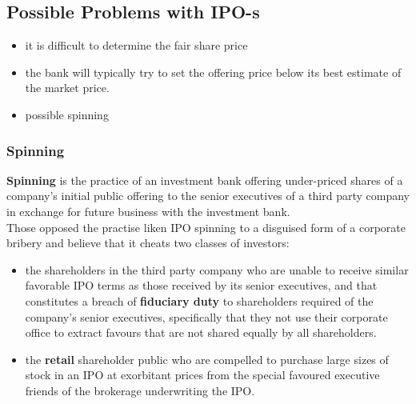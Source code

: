 \subsection{Possible Problems with IPO-s}
\begin{itemize}
	\item it is difficult to determine the fair share price
	\item the bank will typically try to set the offering price below its best estimate of the market price.
	\item possible spinning
\end{itemize}

\subsubsection{Spinning}
\textbf{\color{blue}Spinning} is the practice of an investment bank offering under-priced shares of a company's initial public offering to the senior executives of a third party company in exchange for future business with the investment bank.\\
Those opposed the practise liken IPO spinning to a disguised form of a corporate bribery and believe that it cheats two classes of investors:
\begin{itemize}
	\item the shareholders in the third party company who are unable to receive similar favorable IPO terms as those received by its senior executives, and that constitutes a breach of \textbf{\color{blue}fiduciary duty} to shareholders required of the company's senior executives, specifically that they not use their corporate office to extract favours that are not shared equally by all shareholders.
	\item the \textbf{\color{blue}retail} shareholder public who are compelled to purchase large sizes of stock in an IPO at exorbitant prices from the special favoured executive friends of the brokerage underwriting the IPO. 
\end{itemize}

